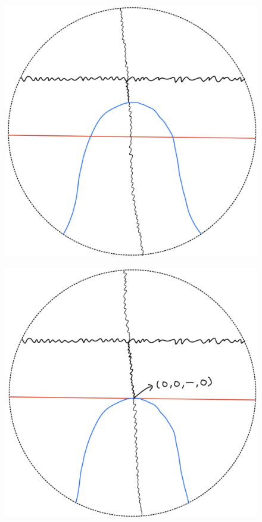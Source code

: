 \begin{definition}
\begin{enumerate}
\begin{itemize}
\begin{figure}[H]
    \caption{}
    \label{fig:your-label}
\end{figure}
\begin{figure}[H]
    \centering
    \includegraphics[scale = 0.45]{diagrams/cobord'2/24.png} 
    \caption{}
    \label{fig:your-label}
\end{figure}
\begin{figure}[H]
    \centering
    \includegraphics[scale = 0.45]{diagrams/cobord'2/25.png} 

\end{figure}
\end{itemize}
\end{enumerate}
\end{definition}
